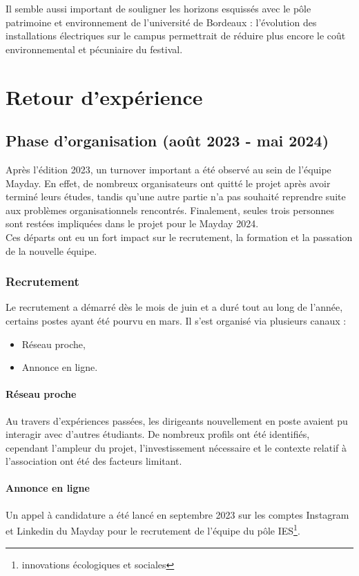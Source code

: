 \documentclass[12pt,a4paper]{report}
\begin{document}
Il semble aussi important de souligner les horizons esquissés avec le pôle patrimoine et environnement de l'université de Bordeaux : l'évolution des installations électriques sur le campus permettrait de réduire plus encore le coût environnemental et pécuniaire du festival.

\chapter{Retour d'expérience}

\section{Phase d'organisation (août 2023 - mai 2024)}

Après l’édition 2023, un turnover important a été observé au sein de l'équipe Mayday. En effet, de nombreux organisateurs ont quitté le projet après avoir terminé leurs études, tandis qu'une autre partie n'a pas souhaité reprendre suite aux problèmes organisationnels rencontrés. Finalement, seules trois personnes sont restées impliquées dans le projet pour le Mayday 2024.\\

Ces départs ont eu un fort impact sur le recrutement, la formation et la passation de la nouvelle équipe.

\subsection{Recrutement}
Le recrutement a démarré dès le mois de juin et a duré tout au long de l’année, certains postes ayant été pourvu en mars. Il s'est organisé via plusieurs canaux :
\begin{itemize}
\item Réseau proche,
\item Annonce en ligne.
\end{itemize}

\subsubsection{Réseau proche}
Au travers d'expériences passées, les dirigeants nouvellement en poste avaient pu interagir avec d'autres étudiants. De nombreux profils ont été identifiés, cependant l'ampleur du projet, l'investissement nécessaire  et le contexte relatif à l'association ont été des facteurs limitant.

\subsubsection{Annonce en ligne}
Un appel à candidature a été lancé en septembre 2023 sur les comptes Instagram et Linkedin du Mayday pour le recrutement de l’équipe du pôle IES\footnote{innovations écologiques et sociales}.
\end{document}

